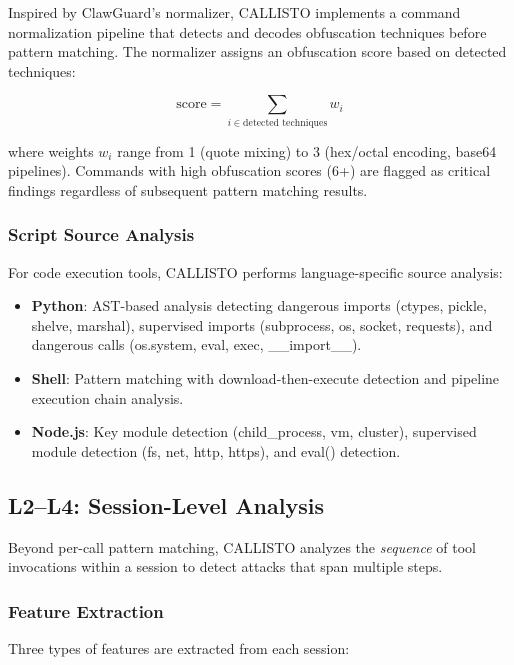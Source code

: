 \documentclass[10pt,conference]{IEEEtran}
\begin{document}
Inspired by ClawGuard's normalizer, CALLISTO implements a command normalization pipeline that detects and decodes obfuscation techniques before pattern matching. The normalizer assigns an obfuscation score based on detected techniques:

\begin{equation}
\text{score} = \sum_{i \in \text{detected techniques}} w_i
\end{equation}

where weights $w_i$ range from 1 (quote mixing) to 3 (hex/octal encoding, base64 pipelines). Commands with high obfuscation scores (6+) are flagged as critical findings regardless of subsequent pattern matching results.

\subsubsection{Script Source Analysis}

For code execution tools, CALLISTO performs language-specific source analysis:
\begin{itemize}
    \item \textbf{Python}: AST-based analysis detecting dangerous imports (ctypes, pickle, shelve, marshal), supervised imports (subprocess, os, socket, requests), and dangerous calls (os.system, eval, exec, \_\_import\_\_).
    \item \textbf{Shell}: Pattern matching with download-then-execute detection and pipeline execution chain analysis.
    \item \textbf{Node.js}: Key module detection (child\_process, vm, cluster), supervised module detection (fs, net, http, https), and eval() detection.
\end{itemize}

\subsection{L2–L4: Session-Level Analysis}

Beyond per-call pattern matching, CALLISTO analyzes the \textit{sequence} of tool invocations within a session to detect attacks that span multiple steps.

\subsubsection{Feature Extraction}

Three types of features are extracted from each session:
\end{document}

